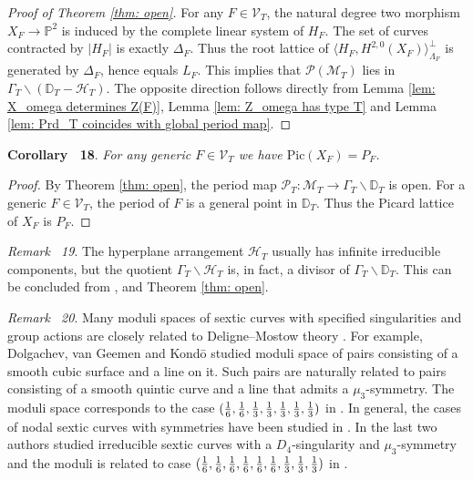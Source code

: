\documentclass[
]{article}
\begin{document}
\emph{Proof of Theorem \ref{thm: open}.} For any \(F\in\mathcal{V}_T\),
the natural degree two morphism \(X_F\to\mathbb{P}^2\) is induced by the
complete linear system of \(H_F\). The set of curves contracted by
\(|H_F|\) is exactly \(\Delta_F\). Thus the root lattice of
\(\langle H_F,H^{2,0}(X_F) \rangle^\perp_{\Lambda_F}\) is generated by
\(\Delta_F\), hence equals \(L_F\). This implies that
\(\mathscr{P}(\mathcal{M}_T)\) lies in
\(\Gamma_T\backslash(\mathbb{D}_T-\mathcal{H}_T)\). The opposite
direction follows directly from Lemma
\ref{lem: X_omega determines Z(F)}, Lemma \ref{lem: Z_omega has type T}
and Lemma \ref{lem: Prd_T coincides with global period map}.~◻

\textbf{Corollary~ 18}. \emph{\label{cor: generic Picard} For any
generic \(F\in\mathcal{V}_T\) we have \(\mathrm{Pic}(X_F)=P_F\).}

\emph{Proof.} By Theorem \ref{thm: open}, the period map
\(\mathscr{P}_T \colon\mathcal{M}_T\to \Gamma_T\backslash \mathbb{D}_T\)
is open. For a generic \(F\in \mathcal{V}_T\), the period of \(F\) is a
general point in \(\mathbb{D}_T\). Thus the Picard lattice of \(X_F\) is
\(P_F\).~◻

\emph{Remark~ 19}. The hyperplane arrangement \(\mathcal{H}_T\) usually
has infinite irreducible components, but the quotient
\(\Gamma_T\backslash\mathcal{H}_T\) is, in fact, a divisor of
\(\Gamma_T\backslash\mathbb{D}_T\). This can be concluded from
\cite{baily1966compactification}, \cite{borel1972metric} and Theorem
\ref{thm: open}.

\emph{Remark~ 20}. Many moduli spaces of sextic curves with specified
singularities and group actions are closely related to Deligne--Mostow
theory \cite{deligne1986monodromy}. For example, Dolgachev, van Geemen
and Kondō \cite{dolgachev2005complex} studied moduli space of pairs
consisting of a smooth cubic surface and a line on it. Such pairs are
naturally related to pairs consisting of a smooth quintic curve and a
line that admits a \(\mu_3\)-symmetry. The moduli space corresponds to
the case
\(({1\over 6}, {1\over 6}, {1\over 3}, {1\over 3}, {1\over 3}, {1\over 3}, {1\over 3})\)
in \cite{mostow1988discontinuous}. In general, the cases of nodal sextic
curves with symmetries have been studied in \cite[\S 5]{yu2023moduli}.
In \cite{zheng2024complex} the last two authors studied irreducible
sextic curves with a \(D_4\)-singularity and \(\mu_3\)-symmetry and the
moduli is related to case
\(({1\over 6}, {1\over 6}, {1\over 6}, {1\over 6}, {1\over 6}, {1\over 6}, {1\over 3}, {1\over 3}, {1\over 3})\)
in \cite{mostow1988discontinuous}.
\end{document}
